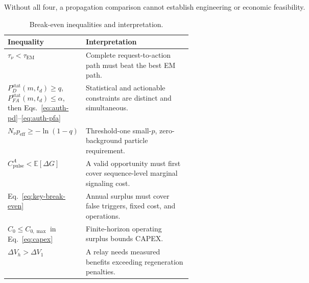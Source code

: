 \documentclass[11pt]{article}
\begin{document}
Without all four, a propagation comparison cannot establish engineering or economic feasibility.

\begin{table}[htbp]
\centering
\caption{Break-even inequalities and interpretation.}
\label{tab:inequalities}
\begin{tabularx}{\linewidth}{L{0.42\linewidth}Y}
\toprule
Inequality & Interpretation \\
\midrule
$\tau_\nu<\tau_{\mathrm{EM}}$ & Complete request-to-action path must beat the best EM path. \\
$P_D^{\mathrm{stat}}(m,t_d)\ge q$, $P_{FA}^{\mathrm{stat}}(m,t_d)\le\alpha$, then Eqs.~\eqref{eq:auth-pd}--\eqref{eq:auth-pfa} & Statistical and actionable constraints are distinct and simultaneous. \\
$N_\nu p_{\mathrm{eff}}\ge-\ln(1-q)$ & Threshold-one small-$p$, zero-background particle requirement. \\
$C_{\mathrm{pulse}}^{A}<\mathbb{E}[\Delta G]$ & A valid opportunity must first cover sequence-level marginal signaling cost. \\
Eq.~\eqref{eq:key-break-even} & Annual surplus must cover false triggers, fixed cost, and operations. \\
$C_0\le C_{0,\max}$ in Eq.~\eqref{eq:capex} & Finite-horizon operating surplus bounds CAPEX. \\
$\Delta V_h>\Delta V_1$ & A relay needs measured benefits exceeding regeneration penalties. \\
\bottomrule
\end{tabularx}
\end{table}
\end{document}
